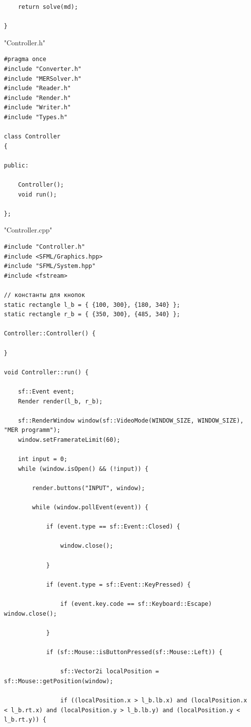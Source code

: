 \documentclass[a4paper,12pt]{article}
\begin{document}
{{{\begin{lstlisting}
	return solve(md);

}
\end{lstlisting}
\newpage
\begin{center}
"Controller.h"
\end{center}
\begin{lstlisting}
#pragma once
#include "Converter.h"
#include "MERSolver.h"
#include "Reader.h"
#include "Render.h"
#include "Writer.h"
#include "Types.h"

class Controller
{

public:

	Controller();
	void run();

};
\end{lstlisting}
\newpage
\begin{center}
"Controller.cpp"
\end{center}
\begin{lstlisting}
#include "Controller.h"
#include <SFML/Graphics.hpp>
#include "SFML/System.hpp"
#include <fstream>

// константы для кнопок
static rectangle l_b = { {100, 300}, {180, 340} };
static rectangle r_b = { {350, 300}, {485, 340} };

Controller::Controller() {

}

void Controller::run() {

	sf::Event event;
	Render render(l_b, r_b);

	sf::RenderWindow window(sf::VideoMode(WINDOW_SIZE, WINDOW_SIZE), "MER programm");
	window.setFramerateLimit(60);

	int input = 0;
	while (window.isOpen() && (!input)) {

		render.buttons("INPUT", window);

		while (window.pollEvent(event)) {

			if (event.type == sf::Event::Closed) {

				window.close();

			}

			if (event.type = sf::Event::KeyPressed) {

				if (event.key.code == sf::Keyboard::Escape) window.close();

			}

			if (sf::Mouse::isButtonPressed(sf::Mouse::Left)) {

				sf::Vector2i localPosition =  sf::Mouse::getPosition(window);

				if ((localPosition.x > l_b.lb.x) and (localPosition.x < l_b.rt.x) and (localPosition.y > l_b.lb.y) and (localPosition.y < l_b.rt.y)) {


\end{lstlisting}}}}
\end{document}
